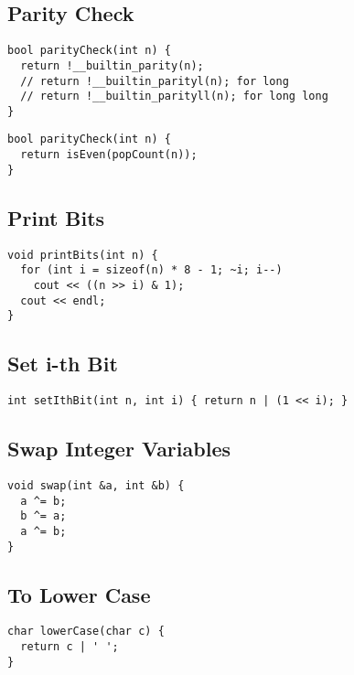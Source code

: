 \documentclass[twoside]{article}
\begin{document}
\begin{multicols*}{2}
\subsectionfont{\large\bfseries\sffamily\underline}
\subsection*{Parity Check}
\begin{verbatim}
bool parityCheck(int n) {
  return !__builtin_parity(n);
  // return !__builtin_parityl(n); for long
  // return !__builtin_parityll(n); for long long
}
\end{verbatim}
\vspace{-12pt}
\begin{verbatim}
bool parityCheck(int n) {
  return isEven(popCount(n));
}
\end{verbatim}

\subsectionfont{\large\bfseries\sffamily\underline}
\subsection*{Print Bits}
\begin{verbatim}
void printBits(int n) {
  for (int i = sizeof(n) * 8 - 1; ~i; i--)
    cout << ((n >> i) & 1);
  cout << endl;
}
\end{verbatim}

\subsectionfont{\large\bfseries\sffamily\underline}
\subsection*{Set i-th Bit}
\begin{verbatim}
int setIthBit(int n, int i) { return n | (1 << i); }
\end{verbatim}

\subsectionfont{\large\bfseries\sffamily\underline}
\subsection*{Swap Integer Variables}
\begin{verbatim}
void swap(int &a, int &b) {
  a ^= b;
  b ^= a;
  a ^= b;
}
\end{verbatim}

\subsectionfont{\large\bfseries\sffamily\underline}
\subsection*{To Lower Case}
\begin{verbatim}
char lowerCase(char c) {
  return c | ' ';
}
\end{verbatim}


\end{multicols*}
\end{document}
